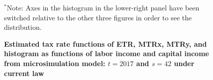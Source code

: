   \begin{figure}[t]\captionsetup{width=6.0in}
    \caption{\label{FigTaxCalc3DvsPred}\textbf{Estimated tax rate functions of ETR, MTRx, MTRy, and histogram as functions of labor income and capital income from microsimulation model: $t=2017$ and $s=42$ under current law}}
    \scriptsize{$^*$Note: Axes in the histogram in the lower-right panel have been switched relative to the other three figures in order to see the distribution.}
  \end{figure}

